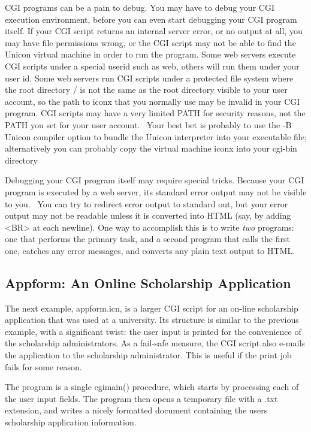 CGI programs can be a pain to debug. You may have to debug your CGI
execution environment, before you can even start debugging your CGI
program itself. If your CGI script returns an {\textquotedbl}internal
server error{\textquotedbl}, or no output at all, you may have file
permissions wrong, or the CGI script may not be able to find the Unicon
virtual machine in order to run the program. Some web servers execute
CGI scripts under a special userid such as
{\textquotedbl}web{\textquotedbl}, others will run them under your user
id. Some web servers run CGI scripts under a protected file system
where the root directory {\textquotedbl}/{\textquotedbl} is not the
same as the root directory visible to your user account, so the path to
iconx that you normally use may be invalid in your CGI program. CGI
scripts may have a very limited PATH for security reasons, not the PATH
you set for your user account. \ Your best bet is probably to use the
-B Unicon compiler option to bundle the Unicon interpreter into your
executable file; alternatively you can probably copy the virtual
machine {\textquotedbl}iconx{\textquotedbl} into your cgi-bin directory

Debugging your CGI program itself may require special tricks. Because
your CGI program is executed by a web server, its standard error output
may not be visible to you. \ You can try to redirect error output to
standard out, but your error output may not be readable unless it is
converted into HTML (say, by adding
\textsf{{\textless}BR{\textgreater}} at each newline). One way to
accomplish this is to write \textit{two} programs: one that performs
the primary task, and a second program that calls the first one,
catches any error messages, and converts any plain text output to HTML.

\subsection{Appform: An Online Scholarship Application}

The next example, \textsf{appform.icn}, is a larger CGI script for an
on-line scholarship application that was used at a university. Its
structure is similar to the previous example, with a significant twist:
the user input is printed for the convenience of the scholarship
administrators. As a fail-safe measure, the CGI script also e-mails the
application to the scholarship administrator. This is useful if the
print job fails for some reason.

The program is a single \textsf{cgimain()} procedure, which starts by
processing each of the user input fields. The program then opens a
temporary file with a \textsf{.txt} extension, and writes a nicely
formatted document containing the user{\textquotesingle}s scholarship
application information.

